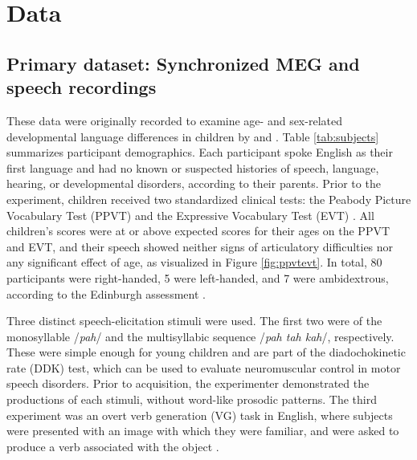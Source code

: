 \documentclass[utf8]{frontiersSCNS} %
\begin{document}
\section{Data}

\subsection{Primary dataset: Synchronized MEG and speech recordings}

These data were originally recorded to examine age- and sex-related developmental language differences in children by \cite{Doesburg2016} and \cite{Yu2014}. Table \ref{tab:subjects} summarizes  participant demographics. Each participant spoke English as their first language and had no known or suspected histories of speech, language, hearing, or developmental disorders, according to their parents. Prior to the experiment, children received two standardized clinical tests: the Peabody Picture Vocabulary Test (PPVT) \cite{Dunn97} and the Expressive Vocabulary Test (EVT) \cite{EVT}. All children's scores were at or above expected scores for their ages on the PPVT and EVT, and their speech showed neither signs of articulatory difficulties nor any significant effect of age, as visualized in Figure \ref{fig:ppvtevt}. In total, 80 participants were right-handed, 5 were left-handed, and 7 were ambidextrous, according to the Edinburgh assessment \cite{Oldfield}. %


Three distinct speech-elicitation stimuli were used. The first two were of the monosyllable /{\em pah}/ and the multisyllabic sequence /{\em pah tah kah}/, respectively. These were simple enough for young children and are part of the diadochokinetic rate (DDK) test, which can be used to evaluate neuromuscular control in motor speech disorders. Prior to acquisition, the experimenter demonstrated the productions of each stimuli, without word-like prosodic patterns. The third experiment was an overt verb generation (VG) task in English, where subjects were presented with an image with which they were familiar, and were asked to produce a verb associated with the object \cite{Doesburg2016}.
\end{document}
